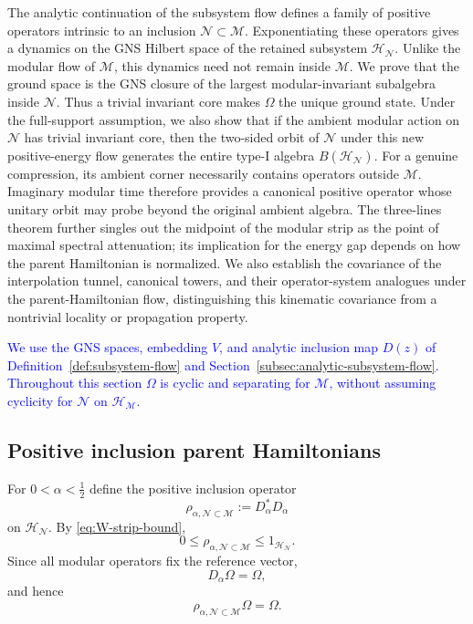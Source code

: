 \documentclass[a4paper,11pt]{article}
\theoremstyle{definition}
\newcommand{\mN}{\mathcal{N}}
\newcommand{\mH}{\mathcal{H}}
\newcommand{\mM}{\mathcal{M}}
\newcommand{\NL}[1]{\textcolor{blue}{#1}}
\begin{document}
The analytic continuation of the subsystem flow defines a family of positive
operators intrinsic to an inclusion $\mN\subset \mM$. Exponentiating these operators gives a dynamics on the GNS
Hilbert space of the retained subsystem $\mH_{\mN}$. Unlike the modular flow of
$\mM$, this dynamics need not remain inside $\mM$. We prove that the ground space is the GNS closure of the
largest modular-invariant subalgebra inside $\mN$. Thus a trivial invariant
core makes $\Omega$ the unique ground state. Under the full-support
assumption, we also show
that if the ambient modular action on $\mN$ has trivial invariant core, then
the two-sided orbit of $\mN$ under this new positive-energy flow
generates the entire type-I algebra $B(\mH_{\mN})$. For a genuine compression,
its ambient corner necessarily contains operators outside $\mM$. Imaginary modular time therefore provides a canonical positive operator whose unitary orbit may probe beyond the original ambient algebra.
The three-lines theorem further singles out the midpoint of the modular strip
as the point of maximal spectral attenuation; its implication for the energy
gap depends on how the parent Hamiltonian is normalized. We also establish
the covariance of the interpolation tunnel, canonical towers, and their
operator-system analogues under the parent-Hamiltonian flow, distinguishing
this kinematic covariance from a nontrivial locality or propagation property.

\NL{We use the GNS spaces, embedding $V$, and analytic inclusion map $D(z)$ of Definition~\ref{def:subsystem-flow} and Section~\ref{subsec:analytic-subsystem-flow}. Throughout this section $\Omega$ is cyclic and separating for $\mM$, without assuming cyclicity for $\mN$ on $\mH_{\mM}$.}

\subsection{Positive inclusion parent Hamiltonians}

For $0<\alpha<\frac12$ define the positive inclusion operator
\begin{equation}
    \boxed{
    \rho_{\alpha,\mN\subset\mM}
    :=
    D_\alpha^*D_\alpha
    }
    \label{eq:rho-alpha-general}
\end{equation}
on $\mH_{\mN}$. By \eqref{eq:W-strip-bound},
\begin{equation}
    0\leq
    \rho_{\alpha,\mN\subset\mM}
    \leq
    1_{\mH_{\mN}}.
    \label{eq:rho-alpha-contraction}
\end{equation}
Since all modular operators fix the reference vector,
\begin{equation}
    D_\alpha\Omega=\Omega,
\end{equation}
and hence
\begin{equation}
    \boxed{
    \rho_{\alpha,\mN\subset\mM}\Omega=\Omega .
    }
    \label{eq:rho-alpha-vacuum}
\end{equation}
\end{document}
